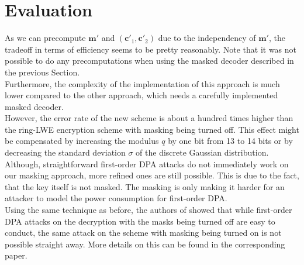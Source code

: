 \section{Evaluation}
As we can precompute \(\textbf{m}'\) and \((\textbf{c}'_1, \textbf{c}'_2)\) due to the independency of \(\textbf{m}'\), the tradeoff in terms of efficiency seems to be pretty reasonably. Note that it was not possible to do any precomputations when using the masked decoder described in the previous Section.\\
Furthermore, the complexity of the implementation of this approach is much lower compared to the other approach, which needs a carefully implemented masked decoder.\\
However, the error rate of the new scheme is about a hundred times higher than the \ac{ring-LWE} encryption scheme with masking being turned off. This effect might be compensated by increasing the modulus \(q\) by one bit from 13 to 14 bits or by decreasing the standard deviation \(\sigma\) of the discrete Gaussian distribution.\\
Although, straightforward first-order \ac{DPA} attacks do not immediately work on our masking approach, more refined ones are still possible. This is due to the fact, that the key itself is not masked. The masking is only making it harder for an attacker to model the power consumption for first-order \ac{DPA}.\\
Using the same technique as before, the authors of \cite{Reparaz2016} showed that while first-order \ac{DPA} attacks on the decryption with the masks being turned off are easy to conduct, the same attack on the scheme with masking being turned on is not possible straight away. More details on this can be found in the corresponding paper.


